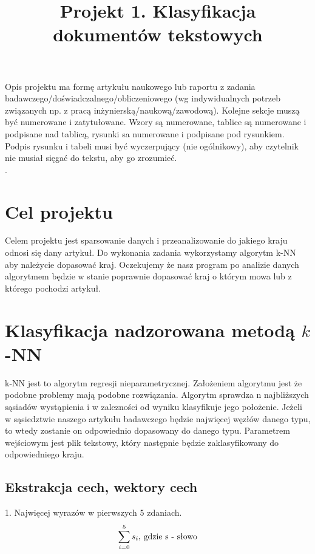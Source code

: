 \documentclass{classrep}
\author{
  \studentinfo{Przemysław Lis}{229940} \and
  \studentinfo{Paweł Cichocki}{150848} }
\title{Projekt 1. Klasyfikacja dokumentów tekstowych}
\begin{document}
\maketitle

Opis projektu ma formę artykułu naukowego lub raportu z zadania
badawczego/doświadczalnego/obliczeniowego (wg indywidualnych potrzeb związanych np. z
pracą inżynierską/naukową/zawodową). Kolejne sekcje muszą być numerowane i
zatytułowane. Wzory są numerowane, tablice są numerowane i podpisane nad
tablicą, rysunki sa numerowane i podpisane pod rysunkiem. Podpis rysunku i
tabeli musi być wyczerpujący (nie ogólnikowy), aby czytelnik nie musiał sięgać do tekstu, aby go
zrozumieć.\\
. 

\section{Cel projektu}
Celem projektu jest sparsowanie danych i przeanalizowanie do jakiego kraju odnosi się 
dany artykuł. Do wykonania zadania wykorzystamy algorytm k-NN aby należycie dopasować
kraj. Oczekujemy że nasz program po analizie danych algorytmem będzie w stanie poprawnie
dopasować kraj o którym mowa lub z którego pochodzi artykuł.\\
\noindent


\section{Klasyfikacja nadzorowana metodą $k$-NN}
k-NN jest to algorytm  regresji nieparametrycznej. Założeniem algorytmu jest że podobne problemy mają podobne rozwiązania. Algorytm sprawdza n najbliższych sąsiadów wystąpienia i w zalezności od wyniku klasyfikuje jego położenie. Jeżeli w sąsiedztwie naszego artykułu badawczego będzie najwięcej węzłów danego typu, to wtedy zostanie on odpowiednio dopasowany do danego typu.
Parametrem wejściowym jest plik tekstowy, który następnie będzie zaklasyfikowany do odpowiedniego kraju.\\
\noindent

\subsection{Ekstrakcja cech, wektory cech}
1. Najwięcej wyrazów w pierwszych 5 zdaniach.\\
\begin{displaymath}
\sum_{i = 0}^{5} s_i \textrm{, gdzie s - słowo}\\
\end{displaymath}
\end{document}
